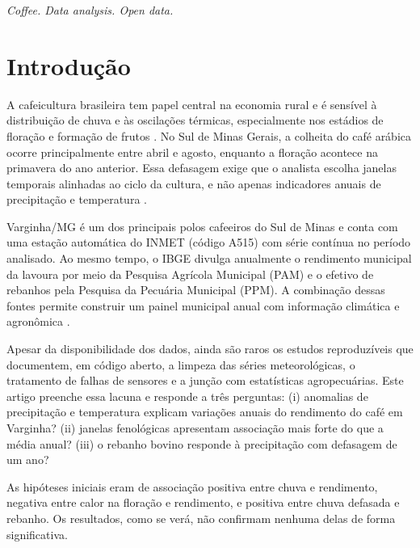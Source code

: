 \documentclass{RBCA}
\begin{document}
\begin{keywordsenglish}
\emph{Coffee. Data analysis. Open data.}
\end{keywordsenglish}

\section{Introdu\c{c}\~ao}

A cafeicultura brasileira tem papel central na economia rural e \'e sens\'ivel \`a distribui\c{c}\~ao de chuva e \`as oscila\c{c}\~oes t\'ermicas, especialmente nos est\'adios de flora\c{c}\~ao e forma\c{c}\~ao de frutos \cite{ipcc2021,aparecido2016}. No Sul de Minas Gerais, a colheita do caf\'e ar\'abica ocorre principalmente entre abril e agosto, enquanto a flora\c{c}\~ao acontece na primavera do ano anterior. Essa defasagem exige que o analista escolha janelas temporais alinhadas ao ciclo da cultura, e n\~ao apenas indicadores anuais de precipita\c{c}\~ao e temperatura \cite{meireles2009}.

Varginha/MG \'e um dos principais polos cafeeiros do Sul de Minas e conta com uma esta\c{c}\~ao autom\'atica do INMET (c\'odigo A515) com s\'erie cont\'inua no per\'iodo analisado. Ao mesmo tempo, o IBGE divulga anualmente o rendimento municipal da lavoura por meio da Pesquisa Agr\'icola Municipal (PAM) e o efetivo de rebanhos pela Pesquisa da Pecu\'aria Municipal (PPM). A combina\c{c}\~ao dessas fontes permite construir um painel municipal anual com informa\c{c}\~ao clim\'atica e agron\^omica \cite{inmet2026,ibgePAM2025,ibgePPM2025}.

Apesar da disponibilidade dos dados, ainda s\~ao raros os estudos reproduz\'iveis que documentem, em c\'odigo aberto, a limpeza das s\'eries meteorol\'ogicas, o tratamento de falhas de sensores e a jun\c{c}\~ao com estat\'isticas agropecu\'arias. Este artigo preenche essa lacuna e responde a tr\^es perguntas: (i) anomalias de precipita\c{c}\~ao e temperatura explicam varia\c{c}\~oes anuais do rendimento do caf\'e em Varginha? (ii) janelas fenol\'ogicas apresentam associa\c{c}\~ao mais forte do que a m\'edia anual? (iii) o rebanho bovino responde \`a precipita\c{c}\~ao com defasagem de um ano?

As hip\'oteses iniciais eram de associa\c{c}\~ao positiva entre chuva e rendimento, negativa entre calor na flora\c{c}\~ao e rendimento, e positiva entre chuva defasada e rebanho. Os resultados, como se ver\'a, n\~ao confirmam nenhuma delas de forma significativa.
\end{document}
